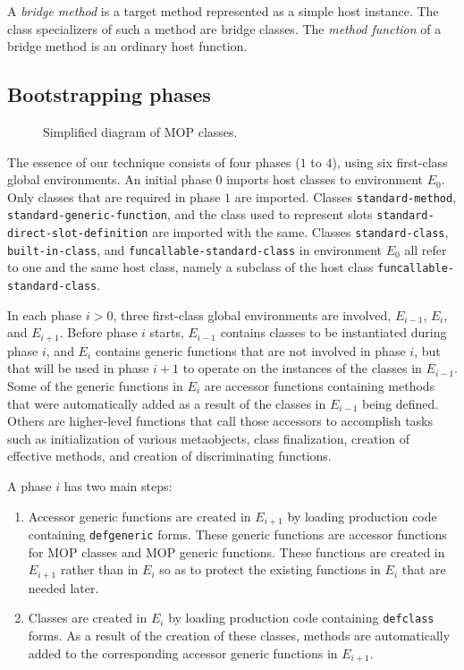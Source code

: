 \begin{definition}
A \emph{bridge method} is a target method represented as a simple host
instance.  The class specializers of such a method are bridge classes.
The \emph{method function} of a bridge method is an ordinary host
function.
\end{definition}

\subsection{Bootstrapping phases}

\begin{figure}
\begin{center}
\end{center}
\caption{\label{fig-mop-classes}
Simplified diagram of MOP classes.}
\end{figure}

The essence of our technique consists of four phases ($1$ to $4$),
using six first-class global environments.  An initial phase $0$
imports host classes to environment $E_0$.  Only classes that are
required in phase $1$ are imported.  Classes \texttt{standard-method},
\texttt{standard-generic-function}, and the class used to represent
slots \texttt{standard-direct-slot-definition} are imported with the
same.  Classes \texttt{standard-class}, \texttt{built-in-class}, and
\texttt{funcallable-standard-class} in environment $E_0$ all
refer to one and the same host class, namely a subclass of the host
class \texttt{funcallable-standard-class}.

In each phase $i > 0$,
three first-class global environments are involved, $E_{i-1}$,
$E_{i}$, and $E_{i+1}$.  Before phase $i$ starts, $E_{i-1}$ contains
classes to be instantiated during phase $i$, and $E_i$ contains
generic functions that are not involved in phase $i$, but that will be
used in phase $i+1$ to operate on the instances of the classes in
$E_{i-1}$.  Some of the generic functions in $E_i$ are accessor
functions containing methods that were automatically added as a result
of the classes in $E_{i-1}$ being defined.  Others are higher-level
functions that call those accessors to accomplish tasks such as
initialization of various metaobjects, class finalization, creation of
effective methods, and creation of discriminating functions.

A phase $i$ has two main steps:

\begin{enumerate}
\item Accessor generic functions are created in $E_{i+1}$ by loading
  \sicl{} production code containing \texttt{defgeneric} forms.  These
  generic functions are accessor functions for MOP classes and MOP
  generic functions.  These functions are created in $E_{i+1}$ rather
  than in $E_i$ so as to protect the existing functions in $E_i$ that
  are needed later.
\item Classes are created in $E_i$ by loading \sicl{} production code
  containing \texttt{defclass} forms.  As a result of the creation of
  these classes, methods are automatically added to the corresponding
  accessor generic functions in $E_{i+1}$.
\end{enumerate}

